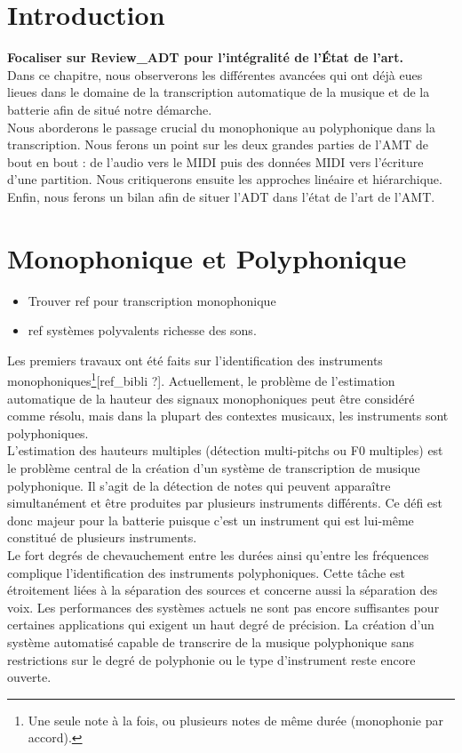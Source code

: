 \section*{Introduction}

\textbf{Focaliser sur Review\_ADT pour l’intégralité de l’État de l’art.}\\

Dans ce chapitre, nous observerons les différentes avancées qui ont déjà eues lieues dans le domaine de la transcription automatique de la musique et de la batterie afin de situé notre démarche.\\
Nous aborderons le passage crucial du monophonique au polyphonique dans la transcription. Nous ferons un point sur les deux grandes parties de l’AMT de bout en bout : de l’audio vers le MIDI puis des données MIDI vers l’écriture d’une partition. Nous critiquerons ensuite les approches linéaire et hiérarchique.\\
Enfin, nous ferons un bilan afin de situer l’ADT dans l’état de l’art de l’AMT.
  
\section{Monophonique et Polyphonique}
\begin{itemize}
	\item Trouver ref pour transcription monophonique
	\item ref systèmes polyvalents richesse des sons.\\
\end{itemize}
Les premiers travaux ont été faits sur l’identification des instruments monophoniques\footnote{Une seule note à la fois, ou plusieurs notes de même durée (monophonie par accord).}[ref\_bibli ?]. Actuellement, le problème de l'estimation automatique de la hauteur des signaux monophoniques peut être considéré comme résolu, mais dans la plupart des contextes musicaux, les instruments sont polyphoniques.\\
L'estimation des hauteurs multiples (détection multi-pitchs ou F0 multiples) est le problème central de la création d'un système de transcription de musique polyphonique. Il s’agit de la détection de notes qui peuvent apparaître simultanément et être produites par plusieurs instruments différents. Ce défi est donc majeur pour la batterie puisque c’est un instrument qui est lui-même constitué de plusieurs instruments.\\
Le fort degrés de chevauchement entre les durées ainsi qu’entre les fréquences complique l’identification des instruments polyphoniques. Cette tâche est étroitement liées à la séparation des sources et concerne aussi la séparation des voix. Les performances des systèmes actuels ne sont pas encore suffisantes pour certaines applications qui exigent un haut degré de précision\cite{future_directions}.
La création d'un système automatisé capable de transcrire de la musique polyphonique sans restrictions sur le degré de polyphonie ou le type d'instrument reste encore ouverte. 
